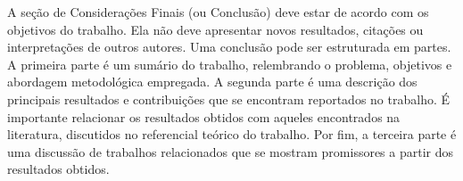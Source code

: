 \documentclass[a4paper,12pt]{article}
\begin{document}
A seção de Considerações Finais (ou Conclusão) deve estar de acordo com os objetivos do trabalho. Ela não deve apresentar novos resultados, citações ou interpretações de outros autores. Uma conclusão pode ser estruturada em partes. A primeira parte é um sumário do trabalho, relembrando o problema, objetivos e abordagem metodológica empregada. A segunda parte é uma descrição dos principais resultados e contribuições que se encontram reportados no trabalho. É importante relacionar os resultados obtidos com aqueles encontrados na literatura, discutidos no referencial teórico do trabalho. Por fim, a terceira parte é uma discussão de trabalhos relacionados que se mostram promissores a partir dos resultados obtidos.




\newpage



\end{document}
